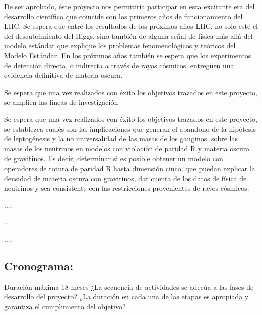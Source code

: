 De ser aprobado, éste proyecto nos permitiría participar en esta
excitante era del desarrollo científico que coincide con
los primeros años de funcionamiento del LHC.  Se espera que entre los
resultados de los próximos años LHC, no solo esté el del
descubrimiento del Higgs, sino también de alguna señal de física más
allá del modelo estándar que explique los problemas fenomenológicos y
teóricos del Modelo Estándar. En los próximos años también se espera
que los experimentos de detección directa, o indirecta a través de
rayos cósmicos, entreguen una evidencia definitiva de materia oscura.

Se espera que una vez realizados con éxito los objetivos trazados en
este proyecto, se amplien las líneas de investigación 


\begin{gravitinodm}
  Se espera que una vez realizados con éxito los objetivos trazados en
  este proyecto, se establezca cualés son las implicaciones que
  generan el abandono de la hipótesis de leptogénesis y la no
  universalidad de las masas de los gauginos, sobre las masas de los
  neutrinos en modelos con violación de paridad R y materia oscura de
  gravitinos. Es decir, determinar si es posible obtener un modelo con
  operadores de rotura de paridad R hasta dimensión cinco, que puedan
  explicar la densidad de materia oscura con gravitinos, dar cuenta de
  los datos de física de neutrinos y sea consistente con las
  restricciones provenientes de rayos cósmicos.
\end{gravitinodm}

\begin{bbrpvlhc}
....
\end{bbrpvlhc}

\begin{brpvlhc}
  ..
\end{brpvlhc}

\begin{darkmatter}
  ....
\end{darkmatter}


\subsection{Cronograma:                                    }
\begin{instrucciones}
Duración máxima 18 meses
  ¿La secuencia de actividades se adecúa a las fases de desarrollo del proyecto? ¿La duración en cada una de las etapas es apropiada y garantiza el cumplimiento del objetivo?
\end{instrucciones}


